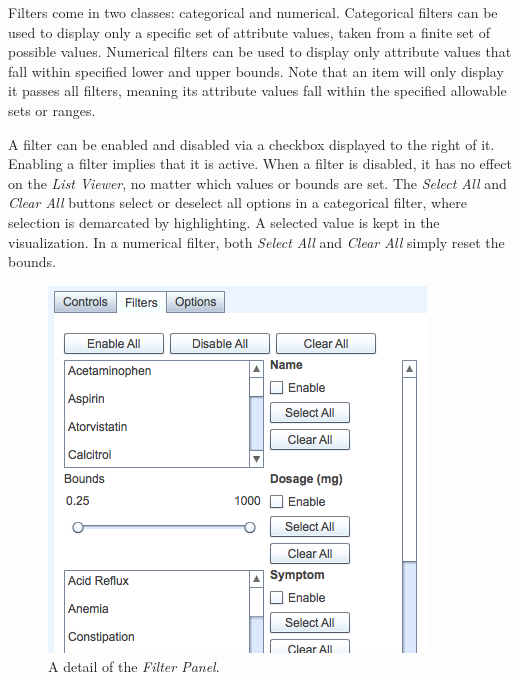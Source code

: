 \documentclass{chi2009}
\newcommand{\ListViewer}{\textit{List Viewer}}
\newcommand{\Filters}{\textit{Filter Panel}}
\begin{document}
Filters come in two classes: categorical and numerical. Categorical filters can be used to display only a specific set of attribute values, taken from a finite set of possible values. Numerical filters can be used to display only attribute values that fall within specified lower and upper bounds. Note that an item will only display it passes all filters, meaning its attribute values fall within the specified allowable sets or ranges.

A filter can be enabled and disabled via a checkbox displayed to the right of it. Enabling a filter implies that it is active. When a filter is disabled, it has no effect on the \ListViewer, no matter which values or bounds are set. The \textit{Select All} and \textit{Clear All} buttons select or deselect all options in a categorical filter, where selection is demarcated by highlighting. A selected value is kept in the visualization. In a numerical filter, both \textit{Select All} and \textit{Clear All} simply reset the bounds.

\begin{figure}
\begin{center}
\includegraphics[width=1\linewidth]{img/filters.png}
\end{center}
   \caption{A detail of the \Filters.}
   \label{fig:filters}
\end{figure}
\end{document}
